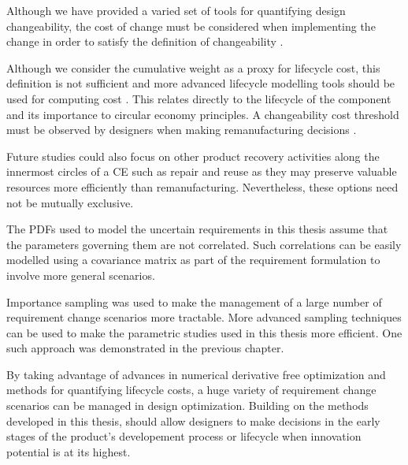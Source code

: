 Although we have provided a varied set of tools for quantifying design changeability, the cost of change must be considered when implementing the change in order to satisfy the definition of changeability \cite{Lawand2019}.

Although we consider the cumulative weight as a proxy for lifecycle cost, this definition is not sufficient and more advanced lifecycle modelling tools should be used for computing cost \cite{Lawand2019}. This relates directly to the lifecycle of the component and its importance to circular economy principles. A changeability cost threshold must be observed by designers when making remanufacturing decisions \cite{Ross2008}. 

Future studies could also focus on other product recovery activities along the innermost circles of a \ac{CE} such as repair and reuse as they may preserve valuable resources more efficiently than remanufacturing. Nevertheless, these options need not be mutually exclusive.

The \acp{PDF} used to model the uncertain requirements in this thesis assume that the parameters governing them are not correlated. Such correlations can be easily modelled using a covariance matrix as part of the requirement formulation to involve more general scenarios. 

Importance sampling was used to make the management of a large number of requirement change scenarios more tractable. More advanced sampling techniques can be used to make the parametric studies used in this thesis more efficient. One such approach was demonstrated in the previous chapter.

By taking advantage of advances in numerical derivative free optimization and methods for quantifying lifecycle costs, a huge variety of requirement change scenarios can be managed in design optimization. Building on the methods developed in this thesis, should allow designers to make decisions in the early stages of the product's developement process or lifecycle when innovation potential is at its highest.